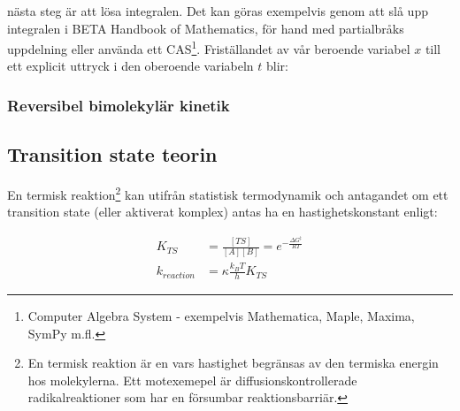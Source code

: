 

nästa steg är att lösa integralen. Det kan göras exempelvis genom att slå
upp integralen i BETA Handbook of Mathematics, för hand med partialbråks
uppdelning eller använda ett CAS\footnote{  Computer Algebra System -
  exempelvis Mathematica, Maple, Maxima, SymPy m.fl.}. Friställandet av
vår beroende variabel $x$ till ett explicit uttryck i den oberoende
variabeln $t$ blir:  



\subsubsection{Reversibel bimolekylär kinetik}
\label{sec:rev_binary}




\subsection{Transition state teorin}
En termisk reaktion\footnote{En termisk reaktion är en vars hastighet begränsas av den termiska
energin hos molekylerna. Ett motexemepel är diffusionskontrollerade
radikalreaktioner som har en försumbar reaktionsbarriär.} kan utifrån
statistisk termodynamik och antagandet om ett transition state (eller
aktiverat komplex) antas ha en hastighetskonstant enligt:

\begin{align}
  \label{eq:K_TS}
  K_{TS} &=\frac{[TS]}{[A][B]}=e^{-\frac{\Delta G^{\ddag}}{RT}} \\
  \label{eq:k_tst}
  k_{reaction} &=\kappa\frac{k_{B}T}{h}K_{TS}
\end{align}


